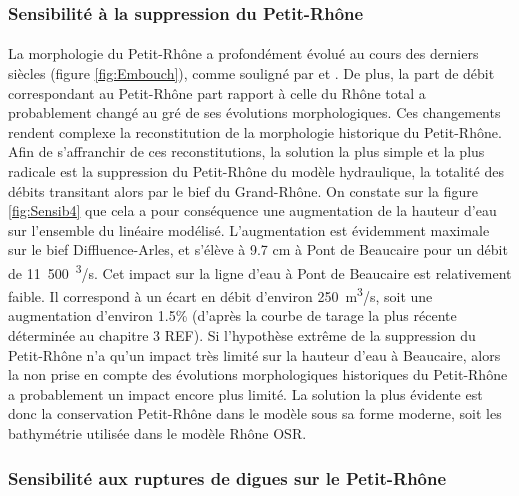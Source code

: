 \documentclass[11pt]{article}
\begin{document}
	\subsubsection{Sensibilité à la suppression du Petit-Rhône} 
	
	\paragraph{} La morphologie du Petit-Rhône a profondément évolué au cours des derniers siècles (figure \ref{fig:Embouch}), comme souligné par \citet{pichard_les_2014} et \citet{raccasi_mutations_2008}. De plus, la part de débit correspondant au Petit-Rhône part rapport à celle du Rhône total a probablement changé au gré de ses évolutions morphologiques. Ces changements rendent complexe la reconstitution de la morphologie historique du Petit-Rhône. Afin de s'affranchir de ces reconstitutions, la solution la plus simple et la plus radicale est la suppression du Petit-Rhône du modèle hydraulique, la totalité des débits transitant alors par le bief du Grand-Rhône. On constate sur la figure \ref{fig:Sensib4} que cela a pour conséquence une augmentation de la hauteur d'eau sur l'ensemble du linéaire modélisé. L'augmentation est évidemment maximale sur le bief Diffluence-Arles, et s'élève à 9.7 cm à Pont de Beaucaire pour un débit de 11~500~\textsuperscript{3}/s. Cet impact sur la ligne d'eau à Pont de Beaucaire est relativement faible. Il correspond à un écart en débit d'environ 250~m\textsuperscript{3}/s, soit une augmentation d'environ 1.5\% (d'après la courbe de tarage la plus récente déterminée au chapitre 3 REF). Si l'hypothèse extrême de la suppression du Petit-Rhône n'a qu'un impact très limité sur la hauteur d'eau à Beaucaire, alors la non prise en compte des évolutions morphologiques historiques du Petit-Rhône a probablement un impact encore plus limité. La solution la plus évidente est donc la conservation Petit-Rhône dans le modèle sous sa forme moderne, soit les bathymétrie utilisée dans le modèle Rhône OSR.
	
	\subsubsection{Sensibilité aux ruptures de digues sur le Petit-Rhône}
	
\end{document}
